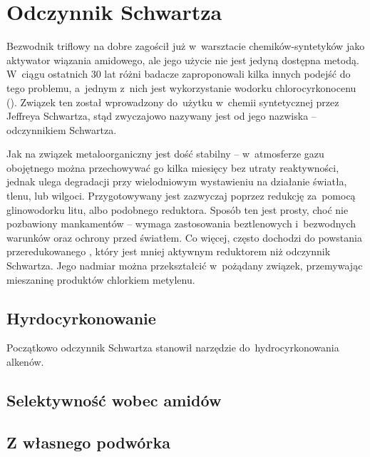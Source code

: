 \section{Odczynnik Schwartza}
Bezwodnik triflowy na dobre zagościł już w~warsztacie chemików-syntetyków
  jako aktywator wiązania amidowego, ale jego użycie nie jest jedyną dostępna metodą.
W~ciągu ostatnich 30 lat różni badacze zaproponowali kilka innych podejść do tego problemu,
  a~jednym z~nich jest wykorzystanie wodorku chlorocyrkonocenu (\ch{[Cp2Zr(H)Cl]}).
Związek ten został wprowadzony do~użytku w~chemii syntetycznej przez Jeffreya Schwartza\autocite{schwartz74},
  stąd zwyczajowo nazywany jest od jego nazwiska \--- odczynnikiem Schwartza.

Jak na związek metaloorganiczny jest dość stabilny \--- w~atmosferze gazu obojętnego
  można przechowywać go kilka miesięcy bez utraty reaktywności,
  jednak ulega degradacji przy wielodniowym wystawieniu na działanie światła,
  tlenu, lub wilgoci.
Przygotowywany jest zazwyczaj poprzez redukcję \ch{[Cp2ZrCl2]} za~pomocą glinowodorku litu,
  albo podobnego reduktora.
Sposób ten jest prosty, choć nie pozbawiony mankamentów \---
  wymaga zastosowania beztlenowych i~bezwodnych warunków oraz ochrony przed światłem.
Co więcej, często dochodzi do powstania przeredukowanego \ch{[Cp2ZrH2]},
  który jest mniej aktywnym reduktorem niż odczynnik Schwartza.
Jego nadmiar można przekształcić w~pożądany związek,
  przemywając mieszaninę produktów chlorkiem metylenu.

\subsection{Hyrdocyrkonowanie}
Początkowo odczynnik Schwartza stanowił narzędzie do~hydrocyrkonowania alkenów.

\subsection{Selektywność wobec amidów}
\subsection{Z własnego podwórka}

